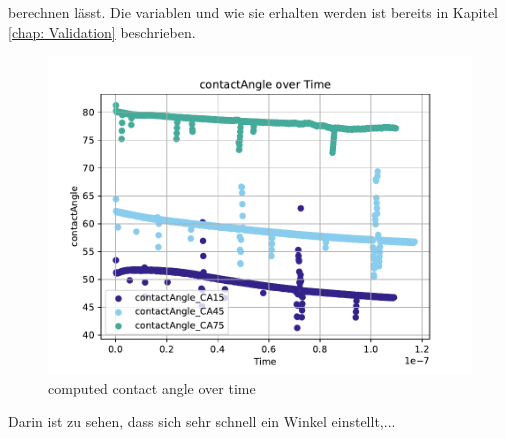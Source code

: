 berechnen lässt. Die variablen und wie sie erhalten werden ist bereits in Kapitel \ref*{chap: Validation} beschrieben. 
\begin{figure}[h]
    \centering
    \includegraphics[width=.95\textwidth]{Pictures/contactAngle_overTime.pdf}
    \caption{computed contact angle over time }
    \label{fig: CA_overTime}
\end{figure}
Darin ist zu sehen, dass sich sehr schnell ein Winkel einstellt,... 






